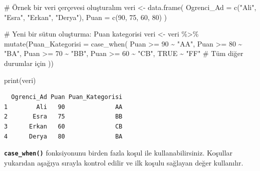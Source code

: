 \documentclass[
  letterpaper,
  DIV=11,
  numbers=noendperiod]{scrreprt}
\newenvironment{Shaded}{\begin{snugshade}}{\end{snugshade}}
\newcommand{\AttributeTok}[1]{\textcolor[rgb]{0.40,0.45,0.13}{#1}}
\newcommand{\CommentTok}[1]{\textcolor[rgb]{0.37,0.37,0.37}{#1}}
\newcommand{\ConstantTok}[1]{\textcolor[rgb]{0.56,0.35,0.01}{#1}}
\newcommand{\DecValTok}[1]{\textcolor[rgb]{0.68,0.00,0.00}{#1}}
\newcommand{\FunctionTok}[1]{\textcolor[rgb]{0.28,0.35,0.67}{#1}}
\newcommand{\NormalTok}[1]{\textcolor[rgb]{0.00,0.23,0.31}{#1}}
\newcommand{\OtherTok}[1]{\textcolor[rgb]{0.00,0.23,0.31}{#1}}
\newcommand{\SpecialCharTok}[1]{\textcolor[rgb]{0.37,0.37,0.37}{#1}}
\newcommand{\StringTok}[1]{\textcolor[rgb]{0.13,0.47,0.30}{#1}}
\begin{document}
\begin{Shaded}
\begin{Highlighting}[]
\CommentTok{\# Örnek bir veri çerçevesi oluşturalım}
\NormalTok{veri }\OtherTok{\textless{}{-}} \FunctionTok{data.frame}\NormalTok{(}
  \AttributeTok{Ogrenci\_Ad =} \FunctionTok{c}\NormalTok{(}\StringTok{"Ali"}\NormalTok{, }\StringTok{"Esra"}\NormalTok{, }\StringTok{"Erkan"}\NormalTok{, }\StringTok{"Derya"}\NormalTok{),}
  \AttributeTok{Puan =} \FunctionTok{c}\NormalTok{(}\DecValTok{90}\NormalTok{, }\DecValTok{75}\NormalTok{, }\DecValTok{60}\NormalTok{, }\DecValTok{80}\NormalTok{)}
\NormalTok{)}

\CommentTok{\# Yeni bir sütun oluşturma: Puan kategorisi}
\NormalTok{veri }\OtherTok{\textless{}{-}}\NormalTok{ veri }\SpecialCharTok{\%\textgreater{}\%}
  \FunctionTok{mutate}\NormalTok{(}\AttributeTok{Puan\_Kategorisi =} \FunctionTok{case\_when}\NormalTok{(}
\NormalTok{    Puan }\SpecialCharTok{\textgreater{}=} \DecValTok{90} \SpecialCharTok{\textasciitilde{}} \StringTok{"AA"}\NormalTok{,}
\NormalTok{    Puan }\SpecialCharTok{\textgreater{}=} \DecValTok{80} \SpecialCharTok{\textasciitilde{}} \StringTok{"BA"}\NormalTok{,}
\NormalTok{    Puan }\SpecialCharTok{\textgreater{}=} \DecValTok{70} \SpecialCharTok{\textasciitilde{}} \StringTok{"BB"}\NormalTok{,}
\NormalTok{    Puan }\SpecialCharTok{\textgreater{}=} \DecValTok{60} \SpecialCharTok{\textasciitilde{}} \StringTok{"CB"}\NormalTok{,}
    \ConstantTok{TRUE} \SpecialCharTok{\textasciitilde{}} \StringTok{"FF"}  \CommentTok{\# Tüm diğer durumlar için}
\NormalTok{  ))}

\FunctionTok{print}\NormalTok{(veri)}
\end{Highlighting}
\end{Shaded}

\begin{verbatim}
  Ogrenci_Ad Puan Puan_Kategorisi
1        Ali   90              AA
2       Esra   75              BB
3      Erkan   60              CB
4      Derya   80              BA
\end{verbatim}

\textbf{\texttt{case\_when()}} fonksiyonunu birden fazla koşul ile
kullanabilirsiniz. Koşullar yukarıdan aşağıya sırayla kontrol edilir ve
ilk koşulu sağlayan değer kullanılır.
\end{document}

